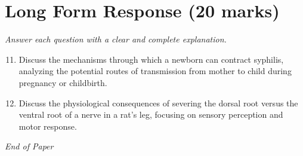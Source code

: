 \documentclass[12pt]{article}
\begin{document}
\section*{Long Form Response (20 marks)}
\textit{Answer each question with a clear and complete explanation.}
\begin{enumerate}[label=\arabic*.]
\setcounter{enumi}{10}
\item Discuss the mechanisms through which a newborn can contract syphilis, analyzing the potential routes of transmission from mother to child during pregnancy or childbirth.
\item Discuss the physiological consequences of severing the dorsal root versus the ventral root of a nerve in a rat's leg, focusing on sensory perception and motor response.
\end{enumerate}

\vfill
\noindent\textit{End of Paper}
\end{document}

